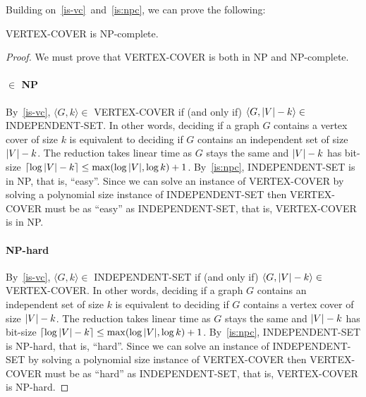 Building on~\ref{is-vc}~and~\ref{is:npc}, we can prove the following:
\begin{theorem}\label{vc:npc}
VERTEX-COVER is NP-complete.
\end{theorem}

\begin{proof}
  We must prove that VERTEX-COVER is both in NP and NP-complete.
  \paragraph{$\in$ NP}
  By~\ref{is-vc}, $\langle G,k \rangle \in$ VERTEX-COVER if (and only if)
  $\langle G,|V|-k\rangle \in$ INDEPENDENT-SET.
  In other words, deciding if a graph $G$ contains a vertex cover of size $k$ is
  equivalent to deciding if $G$ contains an
  independent set of size $|V|-k$. The reduction takes linear time as $G$ stays the
  same and $|V|-k$ has bit-size $\lceil\log |V| - k\rceil \le
  \max(\log|V|,\log k) + 1$.
  By~\ref{is:npc}, INDEPENDENT-SET is in NP, that is, ``easy''. Since
  we can solve an instance of VERTEX-COVER by solving a polynomial size instance of
  INDEPENDENT-SET then VERTEX-COVER must be as ``easy'' as INDEPENDENT-SET, that
  is, VERTEX-COVER is in NP.

  \paragraph{NP-hard}
  By~\ref{is-vc}, $\langle G,k \rangle \in$ INDEPENDENT-SET if (and only if)
  $\langle G,|V|-k\rangle \in$ VERTEX-COVER.
  In other words, deciding if a graph $G$ contains an independent set of size $k$ is
  equivalent to deciding if $G$ contains a
  vertex cover of size $|V|-k$. The reduction takes linear time as $G$ stays the
  same and $|V|-k$ has bit-size $\lceil\log |V| - k\rceil \le
  \max(\log|V|,\log k) + 1$.
  By~\ref{is:npc}, INDEPENDENT-SET is NP-hard, that is, ``hard''. Since
  we can solve an instance of INDEPENDENT-SET by solving a polynomial size instance of
  VERTEX-COVER then VERTEX-COVER must be as ``hard'' as INDEPENDENT-SET, that
  is, VERTEX-COVER is NP-hard.
\end{proof}
